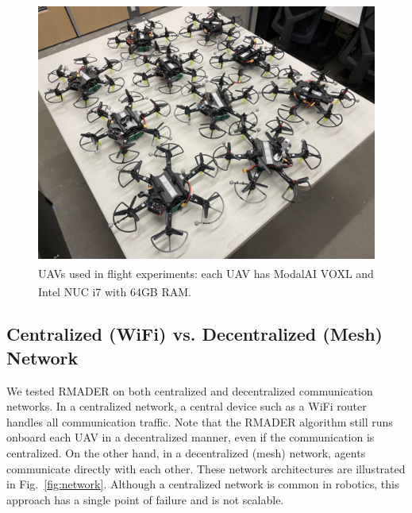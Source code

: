 \begin{figure}
    \centering
    \includegraphics[width=0.7\columnwidth]{figures/uav-pic.jpeg} 
    \setlength{\belowcaptionskip}{-0.5em}
    \caption[UAVs used in flight experiments]{UAVs used in flight experiments: each UAV has ModalAI\textsuperscript{\textregistered} VOXL\textsuperscript{\textregistered} and Intel\textsuperscript{\textregistered} NUC i7 with 64GB RAM.}
    \label{fig:uav-pic}
\end{figure}

\subsection{Centralized (WiFi) vs. Decentralized (Mesh) Network}

We tested RMADER on both centralized and decentralized communication networks.
In a centralized network, a central device such as a WiFi router handles all communication traffic.
Note that the RMADER algorithm still runs onboard each UAV in a decentralized manner, even if the communication is centralized.
On the other hand, in a decentralized (mesh) network, agents communicate directly with each other.
These network architectures are illustrated in Fig.~\ref{fig:network}.
Although a centralized network is common in robotics, this approach has a single point of failure and is not scalable.

